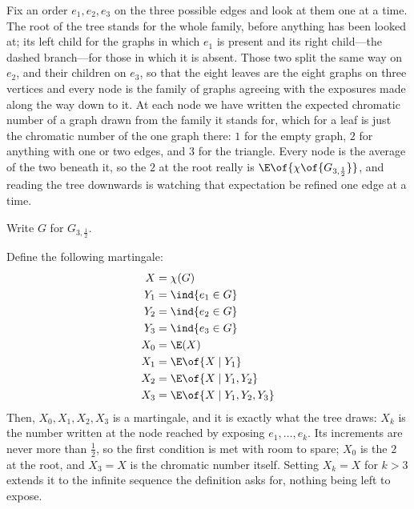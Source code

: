 Fix an order $e_1, e_2, e_3$ on the three possible edges and look at them one at a time. The root of the tree stands for the whole family, before anything has been looked at; its left child for the graphs in which $e_1$ is present and its right child---the dashed branch---for those in which it is absent. Those two split the same way on $e_2$, and their children on $e_3$, so that the eight leaves are the eight graphs on three vertices and every node is the family of graphs agreeing with the exposures made along the way down to it. At each node we have written the expected chromatic number of a graph drawn from the family it stands for, which for a leaf is just the chromatic number of the one graph there: $1$ for the empty graph, $2$ for anything with one or two edges, and $3$ for the triangle. Every node is the average of the two beneath it, so the $2$ at the root really is $\E\of{\chi\of{G_{3, \frac{1}{2}}}}$, and reading the tree downwards is watching that expectation be refined one edge at a time.

Write $G$ for $G_{3, \frac{1}{2}}$.

Define the following martingale:
\begin{align*}
    X &= \chi(G) \\
    Y_1 &= \ind{e_1 \in G} \\
    Y_2 &= \ind{e_2 \in G} \\
    Y_3 &= \ind{e_3 \in G} \\
    X_0 &= \E(X) \\
    X_1 &= \E\of{X \mid Y_1} \\
    X_2 &= \E\of{X \mid Y_1, Y_2} \\
    X_3 &= \E\of{X \mid Y_1, Y_2, Y_3}
\end{align*}
Then, $X_0, X_1, X_2, X_3$ is a martingale, and it is exactly what the tree draws: $X_k$ is the number written at the node reached by exposing $e_1, \ldots, e_k$. Its increments are never more than $\frac{1}{2}$, so the first condition is met with room to spare; $X_0$ is the $2$ at the root, and $X_3 = X$ is the chromatic number itself. Setting $X_k = X$ for $k > 3$ extends it to the infinite sequence the definition asks for, nothing being left to expose.

